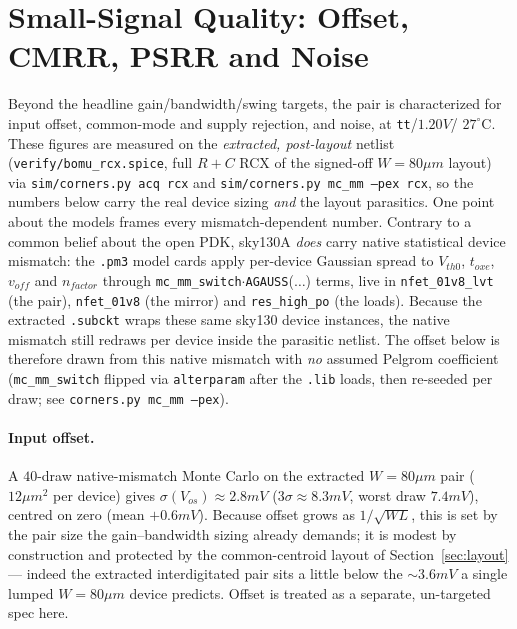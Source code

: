 \documentclass{article}
\begin{document}
\section{Small-Signal Quality: Offset, CMRR, PSRR and Noise}
\label{sec:quality}
Beyond the headline gain/bandwidth/swing targets, the pair is characterized for
input offset, common-mode and supply rejection, and noise, at \texttt{tt}/$1.20V$/
$27^\circ$C. These figures are measured on the \emph{extracted, post-layout} netlist
(\texttt{verify/bomu\_rcx.spice}, full $R+C$ RCX of the signed-off $W{=}80\mu m$ layout)
via \texttt{sim/corners.py acq rcx} and \texttt{sim/corners.py mc\_mm --pex rcx}, so the
numbers below carry the real device sizing \emph{and} the layout parasitics. One
point about the models frames every mismatch-dependent number. Contrary to a common
belief about the open PDK, sky130A \emph{does} carry native statistical device
mismatch: the \texttt{.pm3} model cards apply per-device Gaussian spread to
$V_{th0}$, $t_{oxe}$, $v_{off}$ and $n_{factor}$ through
\texttt{mc\_mm\_switch}$\cdot$\texttt{AGAUSS}($\ldots$) terms, live in
\texttt{nfet\_01v8\_lvt} (the pair), \texttt{nfet\_01v8} (the mirror) and
\texttt{res\_high\_po} (the loads). Because the extracted \texttt{.subckt} wraps these
same sky130 device instances, the native mismatch still redraws per device inside the
parasitic netlist. The offset below is therefore drawn from this native mismatch with
\emph{no} assumed Pelgrom coefficient (\texttt{mc\_mm\_switch} flipped via
\texttt{alterparam} after the \texttt{.lib} loads, then re-seeded per draw; see
\texttt{corners.py mc\_mm --pex}).

\paragraph{Input offset.} A $40$-draw native-mismatch Monte Carlo on the extracted
$W{=}80\mu m$ pair ($12\mu m^2$ per device) gives $\sigma(V_{os})\approx2.8mV$
($3\sigma\approx8.3mV$, worst draw $7.4mV$), centred on zero (mean $+0.6mV$). Because
offset grows as $1/\sqrt{WL}$, this is set by the pair size the gain--bandwidth sizing
already demands; it is modest by construction and protected by the common-centroid
layout of Section~\ref{sec:layout} --- indeed the extracted interdigitated pair sits a
little below the $\sim3.6mV$ a single lumped $W{=}80\mu m$ device predicts. Offset is
treated as a separate, un-targeted spec here.
\end{document}
